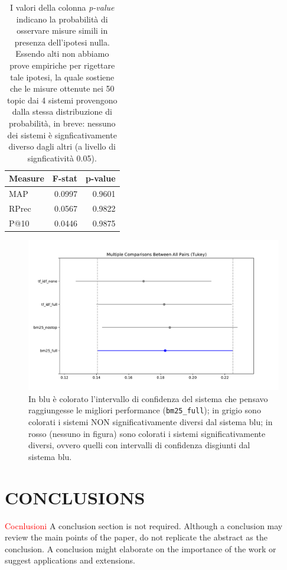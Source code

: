 \documentclass[letterpaper, 10 pt, conference]{ieeeconf}  %
\newcommand\todo[1]{\textcolor{red}{#1}}
\begin{document}
\begin{table}[h]
\centering
\begin{tabular}{|l|r|r|}
\hline
\textbf{Measure} & \textbf{F-stat} & \textbf{p-value} \\ \hline
MAP              & 0.0997          & 0.9601           \\
RPrec            & 0.0567          & 0.9822           \\ 
P@10             & 0.0446          & 0.9875           \\
\hline
\end{tabular}
\caption{I valori della colonna \textit{p-value} indicano la probabilità di osservare misure simili in presenza dell'ipotesi nulla. Essendo alti non abbiamo prove empiriche per rigettare tale ipotesi, la quale sostiene che le misure ottenute nei 50 topic dai 4 sistemi provengono dalla stessa distribuzione di probabilità, in breve: nessuno dei sistemi è signficativamente diverso dagli altri (a livello di signficatività 0.05).}
\label{tab:anova}
\end{table}

\begin{figure}[h!]
    \centering
    \includegraphics[scale=0.4]{figures/tukey_maps.pdf}
    
    \caption{In blu è colorato l'intervallo di confidenza del sistema che pensavo raggiungesse le migliori performance (\texttt{bm25\_full}); in grigio sono colorati i sistemi NON significativamente diversi dal sistema blu; in rosso (nessuno in figura) sono colorati i sistemi significativamente diversi, ovvero quelli con intervalli di confidenza disgiunti dal sistema blu.}
    \label{fig:tukey_maps}
\end{figure}

\section{CONCLUSIONS}
\todo{Cocnlusioni}
A conclusion section is not required. Although a conclusion may review the main points of the paper, do not replicate the abstract as the conclusion. A conclusion might elaborate on the importance of the work or suggest applications and extensions. 
\end{document}
